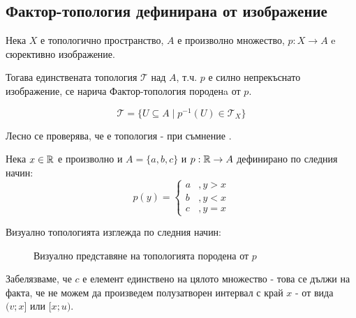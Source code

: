 \subsection{Фактор-топология дефинирана от изображение}
\begin{definition}
    Нека $X$ е топологично пространство, $A$ е произволно множество, $p: X \to A$ e сюрективно изображение.

    Тогава единствената топология $\mathcal T$ над $A$, т.ч. $p$ е силно непрекъснато изображение, се нарича Фактор-топология породенa от $p$.

    \begin{equation}
        \mathcal T = \{U \subseteq A \mid p^{-1}(U) \in \mathcal T_X\}
    \end{equation}
\end{definition}
Лесно се проверява, че е топология - при съмнение \cite[стр.~138]{munkrestopology}.

\begin{example}
    Нека $x \in {\mathbb{R}}$ е произволно и $A = \{a, b, c\}$ и $p: {\mathbb{R}} \to A$ дефинирано по следния начин:
    \begin{equation}
        p(y) = \begin{cases}
            a &, y > x\\
            b &, y < x\\
            c &, y = x
        \end{cases}
    \end{equation}

    Визуално топологията изглежда по следния начин:
    \begin{figure}[H]
        \centering
        \caption{Визуално представяне на топологията породена от $p$}
    \end{figure}
\end{example}

Забелязваме, че $c$ е елемент единствено на цялото множество - това се дължи на факта, че не можем да произведем полузатворен интервал с край $x$ - от вида $(v; x]$ или $[x; u)$.

